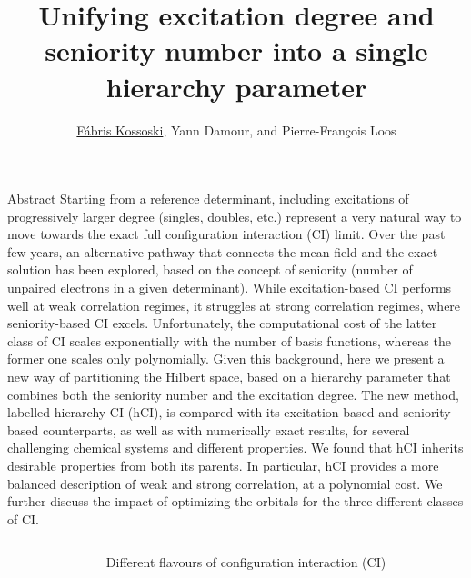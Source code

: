 \documentclass[final]{beamer}
\title{Unifying excitation degree and seniority number into a single hierarchy parameter}
\author{\underline{F\'abris Kossoski}, Yann Damour, and Pierre-Fran\c{c}ois Loos}
\institute[shortinst]{\LCPQ}
\newlength{\sepwidth}
\newlength{\colwidth}
\newcommand{\separatorcolumn}{\begin{column}{\sepwidth}\end{column}}
\begin{document}
\begin{frame}[t]

\begin{alertblock}{Abstract}
Starting from a reference determinant, including excitations of progressively larger degree (singles, doubles, etc.) represent a very natural way to move towards the exact full configuration interaction (CI) limit. Over the past few years, an alternative pathway that connects the mean-field and the exact solution has been explored, based on the concept of seniority (number of unpaired electrons in a given determinant). While excitation-based CI performs well at weak correlation regimes, it struggles at strong correlation regimes, where seniority-based CI excels. Unfortunately, the computational cost of the latter class of CI scales exponentially with the number of basis functions, whereas the former one scales only polynomially. Given this background, here we present a new way of partitioning the Hilbert space, based on a hierarchy parameter that combines both the seniority number and the excitation degree. The new method, labelled hierarchy CI (hCI), is compared with its excitation-based and seniority-based counterparts, as well as with numerically exact results, for several challenging chemical systems and different properties. We found that hCI inherits desirable properties from both its parents. In particular, hCI provides a more balanced description of weak and strong correlation, at a polynomial cost. We further discuss the impact of optimizing the orbitals for the three different classes of CI.
\end{alertblock}

\begin{columns}[t]
\separatorcolumn

\begin{column}{\colwidth}

\vspace{-1.5cm}
\begin{block}{Different flavours of configuration interaction (CI)}


\end{block}
\end{column}
\end{columns}
\end{frame}
\end{document}
